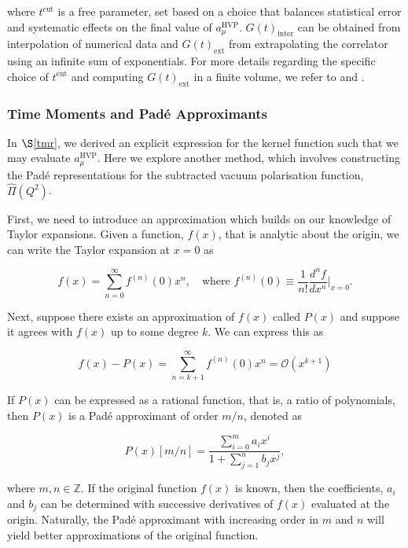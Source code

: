 \documentclass{article}
\numberwithin{equation}{section} %
\begin{document}
\noindent where $t^{\mathrm{cut}}$ is a free parameter, set based on a choice that balances statistical error and systematic effects on the final value of $a_\mu^{\mathrm{HVP}}$. $G(t)_{\mathrm{inter}}$ can be obtained from interpolation of numerical data and $G(t)_{\mathrm{ext}}$ from extrapolating the correlator using an infinite sum of exponentials. For more details regarding the specific choice of $t^{\mathrm{cut}}$ and computing $G(t)_{\mathrm{ext}}$ in a finite volume, we refer to \cite{dellamorte} and \cite{vector}.

\subsubsection{Time Moments and Pad\'{e} Approximants}\label{moments}

In $\S$\ref{tmr}, we derived an explicit expression for the kernel function such that we may evaluate $a_\mu^{\mathrm{HVP}}$. Here we explore another method, which involves constructing the Pad\'{e} representations for the subtracted vacuum polarisation function, $\hat{\Pi}(Q^2)$\cite{dellamorte}.

First, we need to introduce an approximation which builds on our knowledge of Taylor expansions. Given a function, $f(x)$, that is analytic about the origin, we can write the Taylor expansion at $x=0$ as

\begin{equation}
f(x) = \sum_{n=0}^\infty f^{(n)}(0)x^n, \quad \mathrm{where}\,\, f^{(n)}(0) \equiv \frac{1}{n!}\frac{d^nf}{dx^n}\bigg\vert_{x=0}.
\end{equation}

Next, suppose there exists an approximation of $f(x)$ called $P(x)$ and suppose it agrees with $f(x)$ up to some degree $k$\cite{pade}. We can express this as 

\begin{equation}
f(x) - P(x) = \sum_{n=k+1}^\infty f^{(n)}(0)x^n = \mathcal{O}(x^{k+1})
\end{equation}

If $P(x)$ can be expressed as a rational function, that is, a ratio of polynomials, then $P(x)$ is a Pad\'{e} approximant of order $m/n$\cite{pade}, denoted as 

\begin{equation}
P(x)[m/n] = \frac{\sum_{i=0}^ma_ix^i}{1+\sum_{j=1}^nb_jx^j},
\label{pade}
\end{equation}

\noindent where $m,n\in \mathbb{Z}$. If the original function $f(x)$ is known, then the coefficients, $a_i$ and $b_j$ can be determined with successive derivatives of $f(x)$ evaluated at the origin. Naturally, the Pad\'{e} approximant with increasing order in $m$ and $n$ will yield better approximations of the original function.
\end{document}
